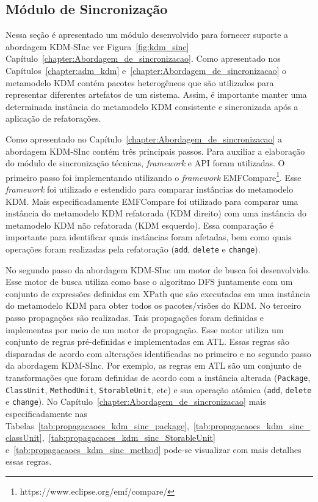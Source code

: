 \subsection{Módulo de Sincronização}

Nessa seção é apresentado um módulo desenvolvido para fornecer suporte a abordagem KDM-SInc ver Figura~\ref{fig:kdm_sinc} Capítulo~\ref{chapter:Abordagem_de_sincronizacao}. Como apresentado nos Capítulos~\ref{chapter:adm_kdm} e~\ref{chapter:Abordagem_de_sincronizacao} o metamodelo KDM contém pacotes heterogêneos que são utilizados para representar diferentes artefatos de um sistema. Assim, é importante manter uma determinada instância do metamodelo KDM consistente e sincronizada após a aplicação de refatorações. 

Como apresentado no Capítulo~\ref{chapter:Abordagem_de_sincronizacao} a abordagem KDM-SInc contém três principais passos. Para auxiliar a elaboração do módulo de sincronização técnicas, \textit{framework} e API foram utilizadas. O primeiro passo foi implementando utilizando o \textit{framework} EMFCompare\footnote{https://www.eclipse.org/emf/compare/}. Esse \textit{framework} foi utilizado e estendido para comparar instâncias do metamodelo KDM. Mais especificadamente EMFCompare foi utilizado para comparar uma instância do metamodelo KDM refatorada (KDM direito) com uma instância do metamodelo KDM não refatorada (KDM esquerdo). Essa comparação é importante para identificar quais instâncias foram afetadas, bem como quais operações foram realizadas pela refatoração (\texttt{add}, \texttt{delete} e \texttt{change}). 

No segundo passo da abordagem KDM-SInc um motor de busca foi desenvolvido. Esse motor de busca utiliza como base o algoritmo DFS juntamente com um conjunto de expressões definidas em XPath que são executadas em uma instância do metamodelo KDM para obter todos os pacotes/visões do KDM. No terceiro passo propagações são realizadas. Tais propagações foram definidas e implementas por meio de um motor de propagação. Esse motor utiliza um conjunto de regras pré-definidas e implementadas em ATL. Essas regras são disparadas de acordo com alterações identificadas no primeiro e no segundo passo da abordagem KDM-SInc. Por exemplo, as regras em ATL são um conjunto de transformações que foram definidas de acordo com a instância alterada (\texttt{Package}, \texttt{ClassUnit}, \texttt{MethodUnit}, \texttt{StorableUnit}, etc) e sua operação atômica (\texttt{add}, \texttt{delete} e \texttt{change}). No Capítulo~\ref{chapter:Abordagem_de_sincronizacao} mais especificadamente nas Tabelas~\ref{tab:propagacaoes_kdm_sinc_package},~\ref{tab:propagacaoes_kdm_sinc_classUnit},~\ref{tab:propagacaoes_kdm_sinc_StorableUnit} e~\ref{tab:propagacaoes_kdm_sinc_method} pode-se visualizar com mais detalhes essas regras.

